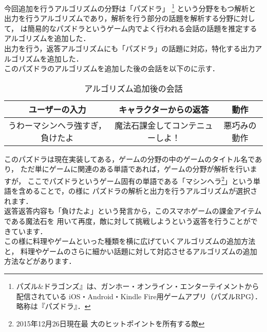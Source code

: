 今回追加を行うアルゴリズムの分野は「パズドラ」
\footnote{パズル&ドラゴンズ』は、ガンホー・オンライン・エンターテイメントから配信されている
iOS・Android・Kindle Fire用ゲームアプリ（パズルRPG）．略称は『パズドラ』．}
という分野をもつ解析と出力を行うアルゴリズムであり，解析を行う部分の話題を解析する分野に対して，
は簡易的なパズドラというゲーム内でよく行われる会話の話題を推定するアルゴリズムを追加した．\\

出力を行う，返答アルゴリズムにも「パズドラ」の話題に対応，特化する出力アルゴリズムを追加した．\\

このパズドラのアルゴリズムを追加した後の会話を以下のに示す．\\

\begin{table}[tbh]
	\caption{アルゴリズム追加後の会話} \label{tab:afterChat}
	\begin{center}
		\begin{tabular}[htb]{c|c|c}
		\hline
		ユーザーの入力 & キャラクターからの返答 & 動作 \\
		\hline
		うわーマシンヘラ強すぎ，負けたよ & 魔法石課金してコンテニューしよ！ & 悪巧みの動作 \\
		\hline
		\end{tabular}
	\end{center}
\end{table}

このパズドラは現在実装してある，ゲームの分野の中のゲームのタイトル名であり，
ただ単にゲームに関連のある単語であれば，ゲームの分野が解析を行いますが，
ここでパズドラというゲーム固有の単語である「マシンへラ\footnote{2015年12月26日現在最
大のヒットポイントを所有する敵}」という単語を含めることで，の様に
パズドラの解析と出力を行うアルゴリズムが選択されます．
\\
返答返答内容も「負けたよ」という発言から，このスマホゲームの課金アイテムである魔法石を
用いて再度，敵に対して挑戦しようという返答を行うことができています．
\\
この様に料理やゲームといった種類を横に広げていくアルゴリズムの追加方法と，
料理やゲームのさらに細かい話題に対して対応させるアルゴリズムの追加方法などがあります．
\\

